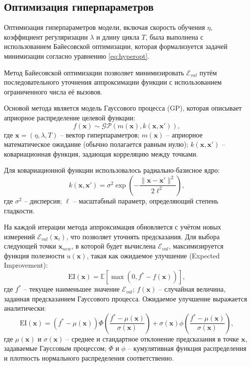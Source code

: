 \subsection{Оптимизация гиперпараметров}\label{sec:ch4/sec3/subsec3}

Оптимизация гиперпараметров модели, включая скорость обучения $\eta$, коэффициент регуляризации
$\lambda$ и длину цикла $T$, была выполнена с использованием Байесовской
оптимизации, которая формализуется задачей минимизации согласно уравнению \ref{eq:hyperopt}.

Метод Байесовской оптимизации позволяет минимизировать $\mathcal{E}_{val}$ путём последовательного
уточнения аппроксимации функции с использованием ограниченного числа её вызовов.

Основой метода является модель Гауссового процесса (GP),
которая описывает априорное распределение целевой функции:
\begin{equation}
f(\mathbf{x}) \sim \mathcal{GP}(m(\mathbf{x}), k(\mathbf{x}, \mathbf{x}')),
\end{equation}
где $\mathbf{x} = (\eta, \lambda, T)$ -- вектор гиперпараметров;
$m(\mathbf{x})$ -- априорное математическое ожидание (обычно полагается равным нулю);
$k(\mathbf{x}, \mathbf{x}')$ -- ковариационная функция, задающая корреляцию между точками.

Для ковариационной функции использовалось радиально-базисное ядро:
\begin{equation*}
k(\mathbf{x}, \mathbf{x}') = \sigma^2 \exp\left(-\frac{\|\mathbf{x} - \mathbf{x}'\|^2}{2\ell^2}\right),
\end{equation*}
где $\sigma^2$ -- дисперсия;
$\ell$ -- масштабный параметр, определяющий степень гладкости.

На каждой итерации метода аппроксимация обновляется с учётом новых
измерений $\mathcal{E}_{val}(\mathbf{x}_i)$, что позволяет уточнять
предсказания. Для выбора следующей точки $\mathbf{x}_{new}$, в которой будет
вычислена $\mathcal{E}_{val}$, максимизируется функция полезности $u(\mathbf{x})$,
такая как ожидаемое улучшение (Expected Improvement):
\begin{equation}
\text{EI}(\mathbf{x}) = \mathbb{E}[\max(0, f^* - f(\mathbf{x}))],
\end{equation}
где $f^*$ -- текущее наименьшее значение $\mathcal{E}_{val}$;
$f(\mathbf{x})$ -- случайная величина, заданная предсказанием
Гауссового процесса. Ожидаемое улучшение выражается аналитически:
\begin{equation*}
\text{EI}(\mathbf{x}) = (f^* - \mu(\mathbf{x}))\Phi\left(\frac{f^* - \mu(\mathbf{x})}{\sigma(\mathbf{x})}\right) + \sigma(\mathbf{x})\phi\left(\frac{f^* - \mu(\mathbf{x})}{\sigma(\mathbf{x})}\right),
\end{equation*}
где $\mu(\mathbf{x})$ и $\sigma(\mathbf{x})$ -- среднее и стандартное отклонение предсказания в
точке $\mathbf{x}$, задаваемые Гауссовым процессом;
$\Phi$ и $\phi$ -- кумулятивная функция распределения и плотность нормального распределения соответственно.

